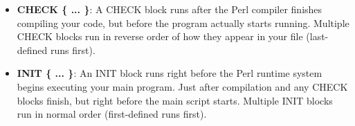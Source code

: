 \documentclass{report}
\begin{document}
\begin{itemize}
\begin{itemize}
\begin{perlcode}
                        sub second_sub {
                            print "Inside second_sub with arguments: @_\n";
                            # When this ends, control goes back to wherever first_sub() was called.
                        }

                        first_sub("Hello", "World");
                    \end{perlcode}
            \end{itemize}
        \item \textbf{CHECK \{ ... \}}:  A CHECK block runs after the Perl compiler finishes compiling your code, but before the program actually starts running.
            \bigbreak \noindent 
             Multiple CHECK blocks run in reverse order of how they appear in your file (last-defined runs first).
        \item \textbf{INIT \{ ... \}}: An INIT block runs right before the Perl runtime system begins executing your main program.
            \bigbreak \noindent 
            Just after compilation and any CHECK blocks finish, but right before the main script starts.
            \bigbreak \noindent 
            Multiple INIT blocks run in normal order (first-defined runs first).


    \end{itemize}
\end{document}
